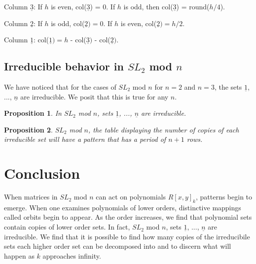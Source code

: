 \documentclass[a4paper,draft]{amsproc}
\theoremstyle{plain}
\newtheorem{prop}{Proposition}[section]
\theoremstyle{definition}
\theoremstyle{remark}
\numberwithin{equation}{section}
\begin{document}
Column $\underline{3}$: If $h$ is even, col($\underline{3}$) = 0. If $h$ is odd, then col($\underline{3}$) = round($h/4$). 

Column $\underline{2}$: If $h$ is odd, col($\underline{2}) = 0$. If $h$ is even, col($\underline{2}) = h/2$. 

Column $\underline{1}$: col($\underline{1}) = h$ - col($\underline{3})$ - col($\underline{2})$. 

\subsection{Irreducible behavior in $SL_{2}$ mod $n$}
We have noticed that for the cases of $SL_{2}$ mod $n$ for $n = 2$ and $n = 3$, the sets $\underline{1}$, ..., $\underline{n}$ are irreducible. We posit that this is true for any $n$. 
\begin{prop}
 In $SL_{2}$ mod $n$, sets $\underline{1}$, ..., $\underline{n}$ are irreducible. 
\end{prop}

\begin{prop}
$SL_{2}$ mod $n$, the table displaying the number of copies of each irreducible set will have a pattern that has a period of $n + 1$  rows. 
\end{prop}

\section{Conclusion}
When matrices in $SL_{2}$ mod $n$ can act on polynomials $R[x,y]_{k}$, patterns begin to emerge. When one examines polynomials of lower orders, distinctive mappings called orbits begin to appear. As the order increases, we find that polynomial sets contain copies of lower order sets.  In fact, $SL_{2}$ mod $n$, sets $\underline{1}$, ..., $\underline{n}$ are irreducible. We find that it is possible to find how many copies of the irreducibile sets each higher order set can be decomposed into and to discern what will happen as $k$ approaches infinity.

\end{document}
